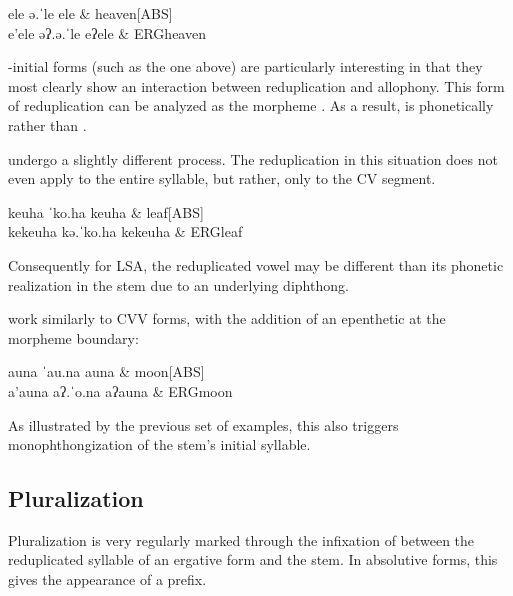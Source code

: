 \begin{subexamples}
  \ex
    \preamble ele
    \pronunciation ə.ˈle
    \gloss
      ele & heaven[ABS] \\
  \ex
    \preamble e'ele
    \pronunciation əʔ.ə.ˈle
    \gloss
      eʔ\allo ele & ERG\allo heaven \\
\end{subexamples}

-initial forms (such as the one above) are particularly interesting in that they most clearly show an interaction between reduplication and allophony. This form of reduplication can be analyzed as the morpheme . As a result,  is phonetically  rather than .

 undergo a slightly different process. The reduplication in this situation does not even apply to the entire syllable, but rather, only to the CV segment.

\begin{subexamples}
  \ex
    \preamble keuha
    \pronunciation ˈko.ha
    \gloss
      keuha & leaf[ABS] \\
  \ex
    \preamble kekeuha
    \pronunciation kə.ˈko.ha
    \gloss
      ke\allo keuha & ERG\allo leaf \\
\end{subexamples}

Consequently for LSA, the reduplicated vowel may be different than its phonetic realization in the stem due to an underlying diphthong.

 work similarly to CVV forms, with the addition of an epenthetic  at the morpheme boundary:

\begin{subexamples}
  \ex
    \preamble auna
    \pronunciation ˈau.na
    \gloss
      auna & moon[ABS] \\
  \ex
    \preamble a'auna
    \pronunciation aʔ.ˈo.na
    \gloss
      aʔ\allo auna & ERG\allo moon \\
\end{subexamples}

As illustrated by the previous set of examples, this also triggers mono\-phthongization of the stem's initial syllable.

\subsection{Pluralization}\label{sec:pluralization}
Pluralization is very regularly marked through the infixation of  between the reduplicated syllable of an ergative form and the stem. In absolutive forms, this gives  the appearance of a prefix.

